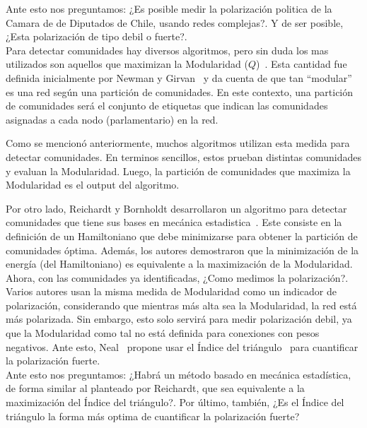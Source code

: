 \documentclass{proyectotesis}
\begin{document}
Ante esto nos preguntamos: ¿Es posible medir la polarización politica de la Camara de de Diputados de Chile, usando redes complejas?. Y de ser posible, ¿Esta polarización de tipo debil o fuerte?.\\

Para detectar comunidades hay diversos algoritmos, pero sin duda los mas utilizados son aquellos que maximizan la Modularidad ($Q$)~\cite{Newman_2004, Clauset_2004, Duch_2005, Blondel_2008, Arab_2012, Chen_2014}. Esta cantidad fue definida inicialmente por Newman y Girvan~\cite{NewmanGirvan_2004} y da cuenta de que tan ``modular'' es una red según una partición de comunidades. En este contexto, una partición de comunidades será el conjunto de etiquetas que indican las comunidades asignadas a cada nodo (parlamentario) en la red.

Como se mencionó anteriormente, muchos algoritmos utilizan esta medida para detectar comunidades. En terminos sencillos, estos prueban distintas comunidades y evaluan la Modularidad. Luego, la partición de comunidades que maximiza la Modularidad es el output del algoritmo.


Por otro lado, Reichardt y Bornholdt desarrollaron un algoritmo para detectar comunidades que tiene sus bases en mecánica estadistica~\cite{Reichardt_2006}. Este consiste en la definición de un Hamiltoniano que debe minimizarse para obtener la partición de comunidades óptima. Además, los autores demostraron que la minimización de la energía (del Hamiltoniano) es equivalente a la maximización de la Modularidad.\\

Ahora, con las comunidades ya identificadas, ¿Como medimos la polarización?. Varios autores usan la misma medida de Modularidad como un indicador de polarización, considerando que mientras más alta sea la Modularidad, la red está más polarizada. Sin embargo, esto solo servirá para medir polarización debil, ya que la Modularidad como tal no está definida para conexiones con pesos negativos. Ante esto, Neal~\cite{Neal_2020} propone usar el Índice del triángulo~\cite{Aref_2018} para cuantificar la polarización fuerte.\\

Ante esto nos preguntamos: ¿Habrá un método basado en mecánica estadística, de forma similar al planteado por Reichardt, que sea equivalente a la maximización del Índice del triángulo?. Por último, también, ¿Es el Índice del triángulo la forma más optima de cuantificar la polarización fuerte?
\end{document}
